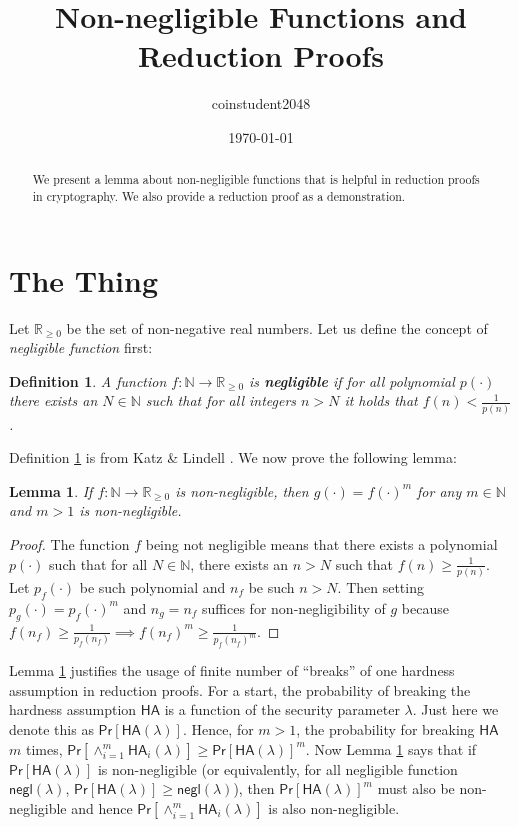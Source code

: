 \documentclass{article}
\title{Non-negligible Functions and Reduction Proofs}
\author{coinstudent2048}
\date{\today}
\newtheorem{definition}{Definition}[section]
\newtheorem{lemma}[theorem]{Lemma}
\begin{document}
\maketitle

\begin{abstract}
We present a lemma about non-negligible functions that is helpful in reduction proofs in cryptography. We also provide a reduction proof as a demonstration.
\end{abstract}

\section{The Thing}
Let $\mathbb{R}_{\ge 0}$ be the set of non-negative real numbers. Let us define the concept of \textit{negligible function} first:

\begin{definition}\label{negl}
A function $f:\mathbb{N}\rightarrow\mathbb{R}_{\ge 0}$ is \textbf{\em negligible} if for all polynomial $p(\cdot)$ there exists an $N\in\mathbb{N}$ such that for all integers $n>N$ it holds that $f(n)<\frac{1}{p(n)}$.
\end{definition}
\noindent Definition \ref{negl} is from Katz \& Lindell \cite{katz-lindell}. We now prove the following lemma:

\begin{lemma}\label{non-negl-exp}
If $f:\mathbb{N}\rightarrow\mathbb{R}_{\ge 0}$ is non-negligible, then $g(\cdot)=f(\cdot)^m$ for any $m\in\mathbb{N}$ and $m>1$ is non-negligible.
\end{lemma}
\begin{proof}
The function $f$ being not negligible means that there exists a polynomial $p(\cdot)$ such that for all $N\in\mathbb{N}$, there exists an $n>N$ such that $f(n)\ge\frac{1}{p(n)}$. Let $p_f(\cdot)$ be such polynomial and $n_f$ be such $n>N$. Then setting $p_g(\cdot)=p_f(\cdot)^m$ and $n_g=n_f$ suffices for non-negligibility of $g$ because $f(n_f)\ge\frac{1}{p_f(n_f)}\implies f(n_f)^m\ge\frac{1}{p_f(n_f)^m}$.
\end{proof}
\noindent Lemma \ref{non-negl-exp} justifies the usage of finite number of ``breaks'' of one hardness assumption in reduction proofs. For a start, the probability of breaking the hardness assumption $\textsf{HA}$ is a function of the security parameter $\lambda$. Just here we denote this as $\textsf{Pr}[\textsf{HA}(\lambda)]$. Hence, for $m>1$, the probability for breaking $\textsf{HA}$ $m$ times, $\textsf{Pr}[\wedge_{i=1}^{m}{\textsf{HA}_i(\lambda)}]\ge\textsf{Pr}[\textsf{HA}(\lambda)]^m$. Now Lemma \ref{non-negl-exp} says that if $\textsf{Pr}[\textsf{HA}(\lambda)]$ is non-negligible (or equivalently, for all negligible function $\textsf{negl}(\lambda)$, $\textsf{Pr}[\textsf{HA}(\lambda)]\ge\textsf{negl}(\lambda)$), then $\textsf{Pr}[\textsf{HA}(\lambda)]^m$ must also be non-negligible and hence $\textsf{Pr}[\wedge_{i=1}^{m}{\textsf{HA}_i(\lambda)}]$ is also non-negligible.
\end{document}
